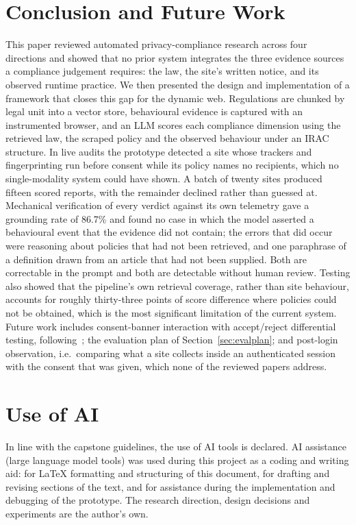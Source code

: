 \documentclass[conference]{IEEEtran}
\begin{document}
\section{Conclusion and Future Work}
\label{sec:conclusion}
This paper reviewed automated privacy-compliance research across four directions and showed that no prior system integrates the three evidence sources a compliance judgement requires: the law, the site's written notice, and its observed runtime practice. We then presented the design and implementation of a framework that closes this gap for the dynamic web. Regulations are chunked by legal unit into a vector store, behavioural evidence is captured with an instrumented browser, and an LLM scores each compliance dimension using the retrieved law, the scraped policy and the observed behaviour under an IRAC structure. In live audits the prototype detected a site whose trackers and fingerprinting run before consent while its policy names no recipients, which no single-modality system could have shown. A batch of twenty sites produced fifteen scored reports, with the remainder declined rather than guessed at. Mechanical verification of every verdict against its own telemetry gave a grounding rate of 86.7\% and found no case in which the model asserted a behavioural event that the evidence did not contain; the errors that did occur were reasoning about policies that had not been retrieved, and one paraphrase of a definition drawn from an article that had not been supplied. Both are correctable in the prompt and both are detectable without human review. Testing also showed that the pipeline's own retrieval coverage, rather than site behaviour, accounts for roughly thirty-three points of score difference where policies could not be obtained, which is the most significant limitation of the current system. Future work includes consent-banner interaction with accept/reject differential testing, following~\cite{bouhoula-2024-cookies}; the evaluation plan of Section~\ref{sec:evalplan}; and post-login observation, i.e.\ comparing what a site collects inside an authenticated session with the consent that was given, which none of the reviewed papers address.

\section{Use of AI}
\label{sec:ai}
In line with the capstone guidelines, the use of AI tools is declared. AI assistance (large language model tools) was used during this project as a coding and writing aid: for LaTeX formatting and structuring of this document, for drafting and revising sections of the text, and for assistance during the implementation and debugging of the prototype. The research direction, design decisions and experiments are the author's own.
\end{document}
